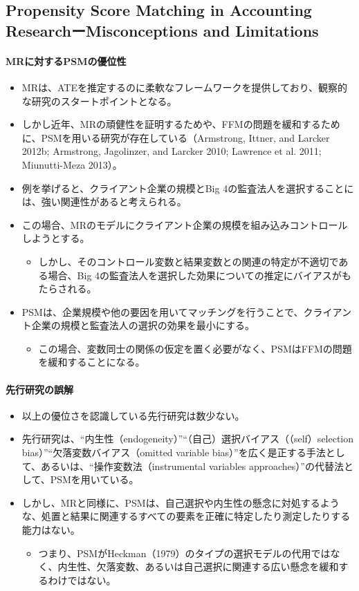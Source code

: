 \subsection*{Propensity Score Matching in Accounting ResearchーMisconceptions and Limitations}

\paragraph{MRに対するPSMの優位性}

\begin{itemize}
 \item MRは、ATEを推定するのに柔軟なフレームワークを提供しており、観察的な研究のスタートポイントとなる。
 \item しかし近年、MRの頑健性を証明するためや、FFMの問題を緩和するために、PSMを用いる研究が存在している（Armstrong, Ittner, and Larcker 2012b; Armstrong, Jagolinzer, and Larcker 2010; Lawrence et al. 2011; Miunutti-Meza 2013）。
 \item 例を挙げると、クライアント企業の規模とBig 4の監査法人を選択することには、強い関連性があると考えられる。
 \item この場合、MRのモデルにクライアント企業の規模を組み込みコントロールしようとする。
  \begin{itemize}
   \item しかし、そのコントロール変数と結果変数との関連の特定が不適切である場合、Big 4の監査法人を選択した効果についての推定にバイアスがもたらされる。
  \end{itemize}
 \item PSMは、企業規模や他の要因を用いてマッチングを行うことで、クライアント企業の規模と監査法人の選択の効果を最小にする。
  \begin{itemize}
   \item この場合、変数同士の関係の仮定を置く必要がなく、PSMはFFMの問題を緩和することになる。
  \end{itemize}
\end{itemize}

\paragraph{先行研究の誤解}

\begin{itemize}
 \item 以上の優位さを認識している先行研究は数少ない。
 \item 先行研究は、``内生性（endogeneity）''``（自己）選択バイアス（（self）selection bias）''``欠落変数バイアス（omitted variable bias）''を広く是正する手法として、あるいは、``操作変数法（instrumental variables approaches）''の代替法として、PSMを用いている。
 \item しかし、MRと同様に、PSMは、自己選択や内生性の懸念に対処するような、処置と結果に関連するすべての要素を正確に特定したり測定したりする能力はない。
  \begin{itemize}
   \item つまり、PSMがHeckman（1979）のタイプの選択モデルの代用ではなく、内生性、欠落変数、あるいは自己選択に関連する広い懸念を緩和するわけではない。
  \end{itemize}
\end{itemize}

